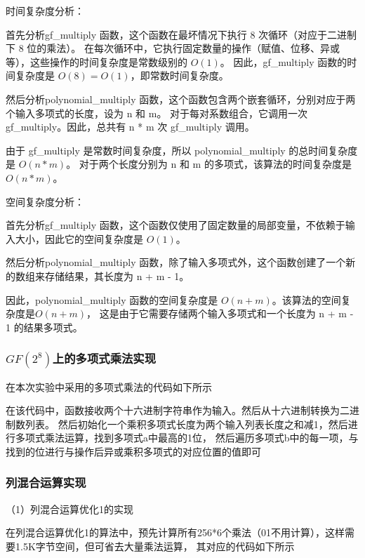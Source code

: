 \documentclass[a4paper,11pt,UTF8]{ctexart}
\begin{document}
                时间复杂度分析：\par
                首先分析gf\_multiply 函数，这个函数在最坏情况下执行 8 次循环（对应于二进制下 8 位的乘法）。
                在每次循环中，它执行固定数量的操作（赋值、位移、异或等），这些操作的时间复杂度是常数级别的 $O(1)$。
                因此，gf\_multiply 函数的时间复杂度是 $O(8) = O(1)$，即常数时间复杂度。\par
                然后分析polynomial\_multiply 函数，这个函数包含两个嵌套循环，分别对应于两个输入多项式的长度，设为 n 和 m。
                对于每对系数组合，它调用一次 gf\_multiply。因此，总共有 n * m 次 gf\_multiply 调用。\par
                由于 gf\_multiply 是常数时间复杂度，所以 polynomial\_multiply 的总时间复杂度是 $O(n * m)$。
                对于两个长度分别为 n 和 m 的多项式，该算法的时间复杂度是 $O(n * m)$。\par
                空间复杂度分析：\par
                首先分析gf\_multiply 函数，这个函数仅使用了固定数量的局部变量，不依赖于输入大小，因此它的空间复杂度是 $O(1)$。\par
                然后分析polynomial\_multiply 函数，除了输入多项式外，这个函数创建了一个新的数组来存储结果，其长度为 n + m - 1。\par
                因此，polynomial\_multiply 函数的空间复杂度是 $O(n + m)$。该算法的空间复杂度是$ O(n + m)$，
                这是由于它需要存储两个输入多项式和一个长度为 n + m - 1 的结果多项式。

        \subsubsection{$GF(2^{8} )$上的多项式乘法实现}
            在本次实验中采用的多项式乘法的代码如下所示
            
            在该代码中，函数接收两个十六进制字符串作为输入。然后从十六进制转换为二进制数列表。
            然后初始化一个乘积多项式长度为两个输入列表长度之和减1，然后进行多项式乘法运算，找到多项式a中最高的1位，
            然后遍历多项式b中的每一项，与找到的位进行与操作后异或乘积多项式的对应位置的值即可
        
        \subsubsection{列混合运算实现}
            （1）列混合运算优化1的实现\par
            在列混合运算优化1的算法中，预先计算所有256*6个乘法（01不用计算），这样需要1.5K字节空间，但可省去大量乘法运算，
            其对应的代码如下所示
            
\end{document}
